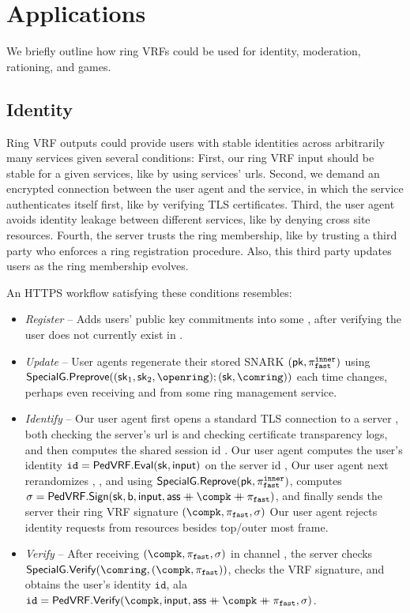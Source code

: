 \section{Applications}
\label{sec:app_short}

We briefly outline how ring VRFs could be used for
 identity, moderation, rationing, and games.


\subsection{Identity}
\label{subsec:app_identity}

Ring VRF outputs could provide users with stable identities across
arbitrarily many services given several conditions:
First, our ring VRF input should be stable for a given services,
 like by using services' urls.
Second, we demand an encrypted connection between the user agent and
the service, in which the service authenticates itself first,
 like by verifying TLS certificates.
Third, the user agent avoids identity leakage between different services,
 like by denying cross site resources.
Fourth, the server trusts the ring membership, like by trusting
 a third party who enforces a ring registration procedure.
Also, this third party updates users as the ring membership evolves.

An HTTPS workflow satisfying these conditions resembles:

\begin{itemize}
\item {\em Register} --
	Adds users' public key commitments into some \ring,
	after verifying the user does not currently exist in \ring.
\item {\em Update} --
	User agents regenerate their stored SNARK $(\mathsf{pk},\pi_{\mathtt{fast}}^{\mathtt{inner}})$ using
	$\SpecialG.\Preprove( (\sk_1,\sk_2,\openring); (\sk,\comring) )$
	each time \ring changes, perhaps even receiving \comring and \openring
	from some ring management service.
\item {\em Identify} --
	Our user agent first opens a standard TLS connection to a server \msg,
	both checking the server's url is \msg and checking certificate
	transparency logs, and then computes the shared session id \aux.
	Our user agent computes the user's identity
	$\mathtt{id} = {\mathsf{PedVRF}}.{\mathsf{Eval}}(\mathsf{sk},\mathsf{input})$ on the server id \msg,
	Our user agent next rerandomizes \pifast, \compk, and \openpk using
	${\mathsf{SpecialG}}.{\mathsf{Reprove}}( \mathsf{pk}, \pi_{\mathtt{fast}}^{\mathtt{inner}} )$, computes
	$\sigma = \PedVRF.\Sign(\sk,\openpk,\msg,\aux \doubleplus \compk \doubleplus \pifast)$,
	and finally sends the server their ring VRF signature $(\compk,\pifast,\sigma)$
	Our user agent rejects identity requests from resources besides
	top/outer most frame.
\item {\em Verify} -- 
	After receiving $(\compk,\pifast,\sigma)$ in channel \aux,
	the server \msg checks $\SpecialG.\Verify( \comring, (\compk,\pifast) )$,
	checks the VRF signature, and obtains the user's identity $\mathtt{id}$, ala \\
	$\mathtt{id} = \PedVRF.\Verify(\compk,\msg,\aux \doubleplus \compk \doubleplus \pifast,\sigma)$.
\end{itemize}


